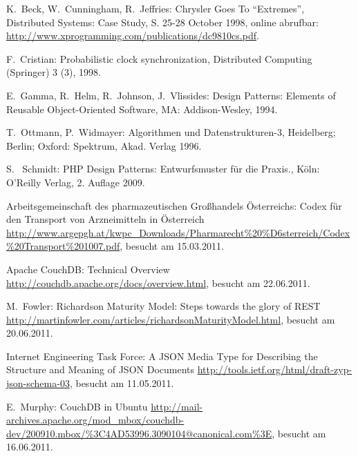 \begin{thebibliography}{99}

	K.\ Beck, W.\ Cunningham, R.\ Jeffries:
	Chrysler Goes To ``Extremes'',
	Distributed Systems: Case Study, S. 25-28 October 1998,
	online abrufbar: \url{http://www.xprogramming.com/publications/dc9810cs.pdf}.

	F.\ Cristian:
	Probabilistic clock synchronization,
	Distributed Computing (Springer) 3 (3), 1998.

  E.\ Gamma, R.\ Helm, R.\ Johnson, J.\ Vlissides:
    Design Patterns: Elements of Reusable Object-Oriented Software,
	MA: Addison-Wesley, 1994.
	
  T.\ Ottmann, P.\ Widmayer:
	Algorithmen und Datenstrukturen-3,
	Heidelberg; Berlin; Oxford: Spektrum, Akad. Verlag 1996.

  S. \ Schmidt:
	PHP Design Patterns: Entwurfsmuster für die Praxis.,
	Köln: O'Reilly Verlag, 2. Auflage 2009.


\hspace{-\leftmargin}{\Large\bfseries Web-Referenzen} %

	Arbeitsgemeinschaft des pharmazeutischen Großhandels Österreichs:
	Codex für den Transport von Arzneimitteln in Österreich
	\url{http://www.argepgh.at/kwpc_Downloads/Pharmarecht%20%D6sterreich/Codex%20Transport%201007.pdf},
	besucht am 15.03.2011.

	Apache CouchDB:
	Technical Overview
	\url{http://couchdb.apache.org/docs/overview.html},
	besucht am 22.06.2011.

	M.\ Fowler:
	Richardson Maturity Model: Steps towards the glory of REST
	\url{http://martinfowler.com/articles/richardsonMaturityModel.html},
	besucht am 20.06.2011.
	
	Internet Engineering Task Force:
	A JSON Media Type for Describing the Structure and Meaning of JSON Documents
	\url{http://tools.ietf.org/html/draft-zyp-json-schema-03},
	besucht am 11.05.2011.

	E.\ Murphy:
	CouchDB in Ubuntu
	\url{http://mail-archives.apache.org/mod_mbox/couchdb-dev/200910.mbox/%3C4AD53996.3090104@canonical.com%3E}, besucht am 16.06.2011.


\end{thebibliography}
